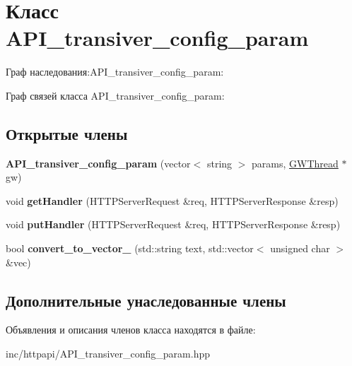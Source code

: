 \hypertarget{classAPI__transiver__config__param}{}\section{Класс A\+P\+I\+\_\+transiver\+\_\+config\+\_\+param}
\label{classAPI__transiver__config__param}


Граф наследования\+:A\+P\+I\+\_\+transiver\+\_\+config\+\_\+param\+:


Граф связей класса A\+P\+I\+\_\+transiver\+\_\+config\+\_\+param\+:
\subsection*{Открытые члены}
\begin{DoxyCompactItemize}
\item 
\mbox{\label{classAPI__transiver__config__param_a0f1239ee425af30ea916ccf33826fcca}} 
{\bfseries A\+P\+I\+\_\+transiver\+\_\+config\+\_\+param} (vector$<$ string $>$ params, \hyperlink{classGWThread}{G\+W\+Thread} $\ast$gw)
\item 
\mbox{\label{classAPI__transiver__config__param_a9c77321a909c28ad56108c4dbd637077}} 
void {\bfseries get\+Handler} (H\+T\+T\+P\+Server\+Request \&req, H\+T\+T\+P\+Server\+Response \&resp)
\item 
\mbox{\label{classAPI__transiver__config__param_a4510d7f769ee0b95eae7f1601e651e57}} 
void {\bfseries put\+Handler} (H\+T\+T\+P\+Server\+Request \&req, H\+T\+T\+P\+Server\+Response \&resp)
\item 
\mbox{\label{classAPI__transiver__config__param_af70ad34c50d00134a66c2640a6590ee6}} 
bool {\bfseries convert\+\_\+to\+\_\+vector\+\_} (std\+::string text, std\+::vector$<$ unsigned char $>$ \&vec)
\end{DoxyCompactItemize}
\subsection*{Дополнительные унаследованные члены}


Объявления и описания членов класса находятся в файле\+:\begin{DoxyCompactItemize}
\item 
inc/httpapi/A\+P\+I\+\_\+transiver\+\_\+config\+\_\+param.\+hpp\end{DoxyCompactItemize}
